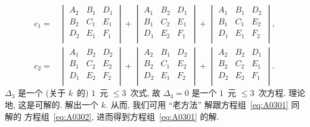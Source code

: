 \begin{align*}
    c_1
    = {} &
    \begin{vmatrix}
        A_2 & B_1 & D_1 \\
        B_2 & C_1 & E_1 \\
        D_2 & E_1 & F_1 \\
    \end{vmatrix}
    +
    \begin{vmatrix}
        A_1 & B_2 & D_1 \\
        B_1 & C_2 & E_1 \\
        D_1 & E_2 & F_1 \\
    \end{vmatrix}
    +
    \begin{vmatrix}
        A_1 & B_1 & D_2 \\
        B_1 & C_1 & E_2 \\
        D_1 & E_1 & F_2 \\
    \end{vmatrix}, \\
    c_2
    = {} &
    \begin{vmatrix}
        A_1 & B_2 & D_2 \\
        B_1 & C_2 & E_2 \\
        D_1 & E_2 & F_2 \\
    \end{vmatrix}
    +
    \begin{vmatrix}
        A_2 & B_1 & D_2 \\
        B_2 & C_1 & E_2 \\
        D_2 & E_1 & F_2 \\
    \end{vmatrix}
    +
    \begin{vmatrix}
        A_2 & B_2 & D_1 \\
        B_2 & C_2 & E_1 \\
        D_2 & E_2 & F_1 \\
    \end{vmatrix}.
\end{align*}
\(\Delta_3\) 是一个 (关于 \(k\)~的) \(1\)~元 \({\leq} 3\)~次式,
故 \(\Delta_3 = 0\) 是一个 \(1\)~元 \({\leq} 3\)~次方程.
理论地, 这是可解的.
解出一个 \(k\).
从而, 我们可用 ``老方法''
解跟方程组~\eqref{eq:A0301} 同解的%
方程组~\eqref{eq:A0302},
进而得到方程组~\eqref{eq:A0301} 的解.

